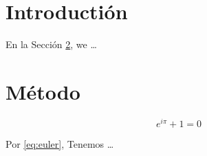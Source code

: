 \documentclass{article}
\begin{document}
\section{Introducti\'on}
\label{sec:intro}

En la Sección \ref{sec:metodo},
we \ldots

\section{M\'etodo}
\label{sec:metodo}

\begin{equation}
\label{eq:euler}
e^{i\pi} + 1 = 0
\end{equation}

Por \eqref{eq:euler}, Tenemos \ldots
\end{document}
